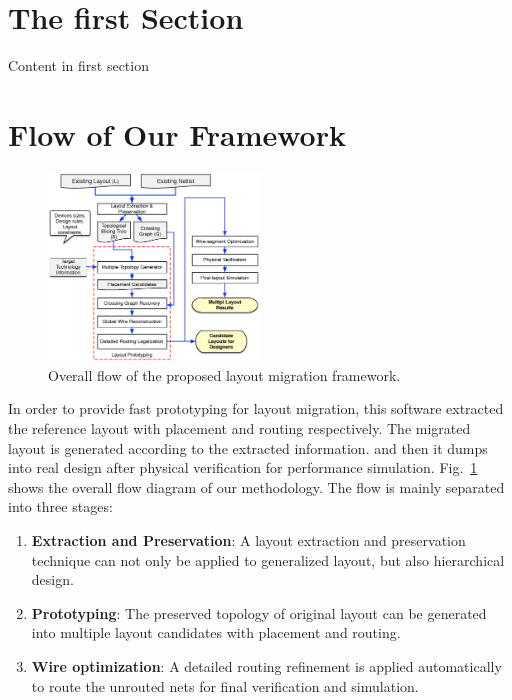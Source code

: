 
\section{The first Section}

  Content in first section \cite{Chin_DMR_ICCAD2013}

   

\section{Flow of Our Framework}
  \begin{figure}[ht]
    \centering
    \centerline{
      \includegraphics[width=0.5\textwidth]{Fig/proto_flow.eps}
    }
    \caption{Overall flow of the proposed layout migration framework.} 
    \label{fig:Flow}
  \end{figure}


  In order to provide fast prototyping for layout migration, this software extracted the reference layout with placement and routing respectively. The migrated layout is generated according to the extracted information. and then it dumps into real design after physical verification for performance simulation. Fig.~\ref{fig:Flow} shows the overall flow diagram of our methodology.
  The flow is mainly separated into three stages: 
  \begin{enumerate}
    \item {\bf Extraction and Preservation}: A layout extraction and preservation technique \cite{Chin_DMR_ICCAD2013} can not only be applied to generalized layout, but also hierarchical design.
    \item {\bf Prototyping}: The preserved topology of original layout can be generated into multiple layout candidates with placement and routing. 
    \item {\bf Wire optimization}: A detailed routing refinement is applied automatically to route the unrouted nets for final verification and simulation.
  \end{enumerate}

